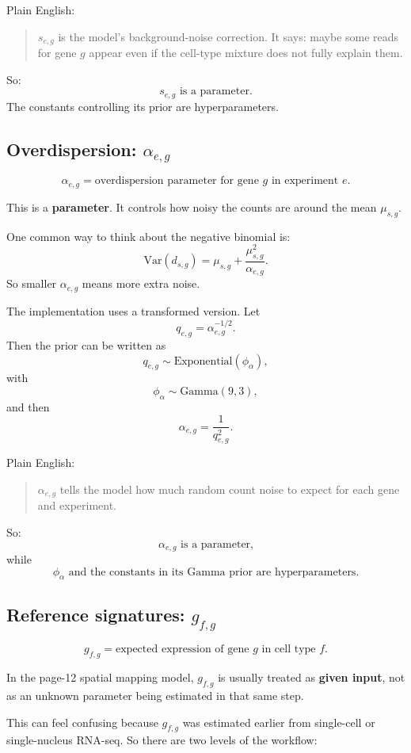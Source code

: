 \documentclass[11pt]{article}
\newcommand{\Var}{\mathrm{Var}}
\newcommand{\term}[1]{\textbf{#1}}
\begin{document}
Plain English:

\begin{quote}
$s_{e,g}$ is the model's background-noise correction. It says: maybe some reads for gene $g$ appear even if the cell-type mixture does not fully explain them.
\end{quote}

So:
\[
s_{e,g}\text{ is a parameter.}
\]
The constants controlling its prior are hyperparameters.

\subsection{Overdispersion: $\alpha_{e,g}$}

\[
\alpha_{e,g}=\text{overdispersion parameter for gene }g\text{ in experiment }e.
\]

This is a \term{parameter}. It controls how noisy the counts are around the mean $\mu_{s,g}$.

One common way to think about the negative binomial is:
\[
\Var(d_{s,g})=\mu_{s,g}+\frac{\mu_{s,g}^2}{\alpha_{e,g}}.
\]
So smaller $\alpha_{e,g}$ means more extra noise.

The implementation uses a transformed version. Let
\[
q_{e,g}=\alpha_{e,g}^{-1/2}.
\]
Then the prior can be written as
\[
q_{e,g}\sim \mathrm{Exponential}(\phi_\alpha),
\]
with
\[
\phi_\alpha\sim \mathrm{Gamma}(9,3),
\]
and then
\[
\alpha_{e,g}=\frac{1}{q_{e,g}^2}.
\]

Plain English:

\begin{quote}
$\alpha_{e,g}$ tells the model how much random count noise to expect for each gene and experiment.
\end{quote}

So:
\[
\alpha_{e,g}\text{ is a parameter,}
\]
while
\[
\phi_\alpha\text{ and the constants in its Gamma prior are hyperparameters.}
\]

\subsection{Reference signatures: $g_{f,g}$}

\[
g_{f,g}=\text{expected expression of gene }g\text{ in cell type }f.
\]

In the page-12 spatial mapping model, $g_{f,g}$ is usually treated as \term{given input}, not as an unknown parameter being estimated in that same step.

This can feel confusing because $g_{f,g}$ was estimated earlier from single-cell or single-nucleus RNA-seq. So there are two levels of the workflow:
\end{document}
